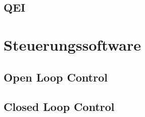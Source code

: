 \subsection{QEI}
\label{subsec:SW_qei}

	

\section{Steuerungssoftware}
\label{sec:SW_steuerungssoftware}

\subsection{Open Loop Control}
\label{subsec:SW_openloopcontrol}

\subsection{Closed Loop Control}
\label{subsec:SW_closedloopcontrol}
		